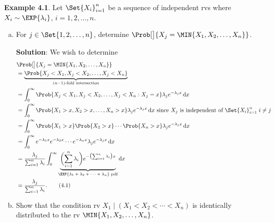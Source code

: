 \begin{Example}
    \textbf{Example 4.1}. Let $ \Set{X_i}_{i=1}^n $ be a sequence of independent rvs where $ X_i \sim \EXP{\lambda_i} $, $ i=1,2,\ldots,n $.
    \begin{enumerate}[(a)]
        \item For $ j\in\Set{1,2,\ldots,n} $, determine $ \Prob[\big]{X_j=\MIN{X_1,X_2,\ldots,X_n}} $.

              \textbf{Solution}: We wish to determine
              \begin{align*}
                   & \Prob[\big]{X_j=\MIN{X_1,X_2,\ldots,X_n}}                                                                                                                                                                                 \\
                   & =\underbrace{\Prob{X_j<X_1,X_j<X_2,\ldots,X_j<X_n}}_{(n-1)\text{-fold intersection}}                                                                                                                                      \\
                   & =\int_{0}^{\infty}\Prob{X_j<X_1,X_j<X_2,\ldots,X_j<X_n\given X_j=x}\lambda_j e^{-\lambda_j x}\odif{x}                                                                                                                     \\
                   & =\int_{0}^{\infty}\Prob{X_1>x,X_2>x,\ldots,X_n>x}\lambda_j e^{-\lambda_j x}\odif{x}\text{ since $X_j$ is independent of $ \Set{X_i}_{i=1}^n\; i\ne j $}                                                                   \\
                   & =\int_{0}^{\infty}\Prob{X_1>x}\Prob{X_2>x}\cdots\Prob{X_n>x}\lambda_j e^{-\lambda_j x}\odif{x}                                                                                                                            \\
                   & =\int_{0}^{\infty}e^{-\lambda_1 x}e^{-\lambda_2 x}\cdots e^{-\lambda_n x}\lambda_j e^{-\lambda_j x}\odif{x}                                                                                                               \\
                   & =\frac{\lambda_j}{\sum_{i=1}^{n}\lambda_i} \int_{0}^{\infty}\underbrace{\biggl(\sum_{i=1}^{n}\lambda_i\biggr)e^{-\bigl(\sum_{i=1}^{n}\lambda_i\bigr)x}}_{\text{$\EXP{\lambda_1+\lambda_2+\cdots+\lambda_n}$ pdf}}\odif{x} \\
                   & =\frac{\lambda_j}{\sum_{i=1}^{n}\lambda_i}.\tag*{(4.1)}\label{eq4.1}
              \end{align*}
        \item Show that the condition rv $ X_1\mid(X_1<X_2<\cdots<X_n) $ is identically distributed to the rv $ \MIN{X_1,X_2,\ldots,X_n} $.


\end{enumerate}
\end{Example}
